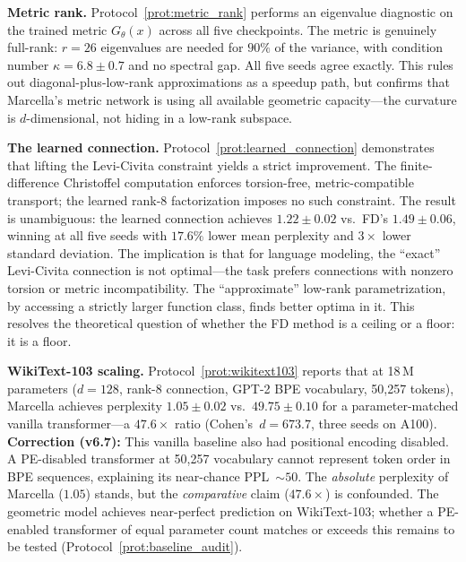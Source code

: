 \documentclass[11pt,a4paper]{article}
\theoremstyle{definition}
\theoremstyle{remark}
\begin{document}
\medskip

\textbf{Metric rank.} Protocol~\ref{prot:metric_rank} performs 
an eigenvalue diagnostic on the trained metric $G_\theta(x)$ 
across all five checkpoints. The metric is genuinely full-rank: 
$r = 26$ eigenvalues are needed for $90\%$ of the variance, 
with condition number $\kappa = 6.8 \pm 0.7$ and no spectral 
gap. All five seeds agree exactly. This rules out 
diagonal-plus-low-rank approximations as a speedup path, but 
confirms that Marcella's metric network is using all available 
geometric capacity---the curvature is $d$-dimensional, not 
hiding in a low-rank subspace.

\medskip

\textbf{The learned connection.} 
Protocol~\ref{prot:learned_connection} demonstrates that lifting 
the Levi-Civita constraint yields a strict improvement. The 
finite-difference Christoffel computation enforces torsion-free, 
metric-compatible transport; the learned rank-8 factorization 
imposes no such constraint. The result is unambiguous: the learned 
connection achieves $1.22 \pm 0.02$ vs.\ FD's $1.49 \pm 0.06$, 
winning at all five seeds with $17.6\%$ lower mean perplexity and 
$3\times$ lower standard deviation. The implication is that for language 
modeling, the ``exact'' Levi-Civita connection is not optimal---the 
task prefers connections with nonzero torsion or metric 
incompatibility. The ``approximate'' low-rank parametrization, by 
accessing a strictly larger function class, finds better optima in 
it. This resolves the theoretical question of whether the FD method 
is a ceiling or a floor: it is a floor.

\medskip

\textbf{WikiText-103 scaling.} 
Protocol~\ref{prot:wikitext103} reports that at 
18\,M parameters ($d = 128$, rank-8 connection, GPT-2 BPE 
vocabulary, 50{,}257 tokens), Marcella achieves perplexity 
$\mathbf{1.05 \pm 0.02}$ vs.\ $\mathbf{49.75 \pm 0.10}$ for a 
parameter-matched vanilla transformer---a $47.6\times$ ratio 
(Cohen's~$d = 673.7$, three seeds on A100). 
\textbf{Correction (v6.7):} This vanilla baseline also had 
positional encoding disabled. A PE-disabled transformer at 
50{,}257 vocabulary cannot represent token order in BPE 
sequences, explaining its near-chance PPL~${\sim}50$. The 
\emph{absolute} perplexity of Marcella ($1.05$) stands, 
but the \emph{comparative} claim ($47.6\times$) is confounded. 
The geometric model achieves near-perfect prediction on 
WikiText-103; whether a PE-enabled transformer of equal 
parameter count matches or exceeds this remains to be tested 
(Protocol~\ref{prot:baseline_audit}).
\end{document}
